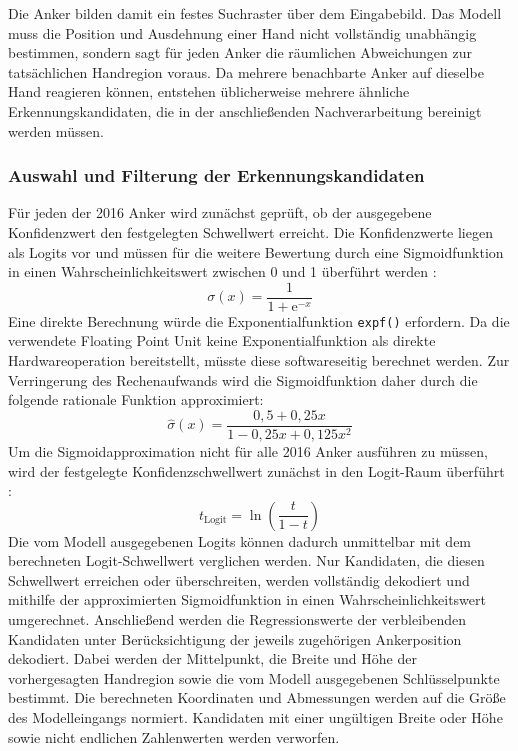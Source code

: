 Die Anker bilden damit ein festes Suchraster über dem Eingabebild. Das Modell muss die Position und Ausdehnung einer Hand nicht vollständig unabhängig bestimmen, sondern sagt für jeden Anker die räumlichen Abweichungen zur tatsächlichen Handregion voraus. Da mehrere benachbarte Anker auf dieselbe Hand reagieren können, entstehen üblicherweise mehrere ähnliche Erkennungskandidaten, die in der anschließenden Nachverarbeitung bereinigt werden müssen.

\subsubsection{Auswahl und Filterung der Erkennungskandidaten}\label{ssub:kandidaten-filterung}
Für jeden der 2016 Anker wird zunächst geprüft, ob der ausgegebene Konfidenzwert den festgelegten Schwellwert erreicht. Die Konfidenzwerte liegen als Logits vor und müssen für die weitere Bewertung durch eine Sigmoidfunktion in einen Wahrscheinlichkeitswert zwischen 0 und 1 überführt werden \cite{sharmaACTIVATIONFUNCTIONSNEURAL2020}:
$$ \sigma(x) = \frac{1}{1 + \mathrm{e}^{-x}} $$
Eine direkte Berechnung würde die Exponentialfunktion \texttt{expf()} erfordern. Da die verwendete Floating Point Unit keine Exponentialfunktion als direkte Hardwareoperation bereitstellt, müsste diese softwareseitig berechnet werden. Zur Verringerung des Rechenaufwands wird die Sigmoidfunktion daher durch die folgende rationale Funktion approximiert:
$$\hat{\sigma}(x)=\frac{0{,}5+0{,}25x}{1-0{,}25x+0{,}125x^2}$$
Um die Sigmoidapproximation nicht für alle 2016 Anker ausführen zu müssen, wird der festgelegte Konfidenzschwellwert zunächst in den Logit-Raum überführt \cite[S. 340 ff.]{athavaleVerifyingGlobalTwoSafety2024}:
$$ t_{\mathrm{Logit}} = \ln\left(\frac{t}{1-t}\right) $$
Die vom Modell ausgegebenen Logits können dadurch unmittelbar mit dem berechneten Logit-Schwellwert verglichen werden. Nur Kandidaten, die diesen Schwellwert erreichen oder überschreiten, werden vollständig dekodiert und mithilfe der approximierten Sigmoidfunktion in einen Wahrscheinlichkeitswert umgerechnet. Anschließend werden die Regressionswerte der verbleibenden Kandidaten unter Berücksichtigung der jeweils zugehörigen Ankerposition dekodiert. Dabei werden der Mittelpunkt, die Breite und Höhe der vorhergesagten Handregion sowie die vom Modell ausgegebenen Schlüsselpunkte bestimmt. Die berechneten Koordinaten und Abmessungen werden auf die Größe des Modelleingangs normiert. Kandidaten mit einer ungültigen Breite oder Höhe sowie nicht endlichen Zahlenwerten werden verworfen.

